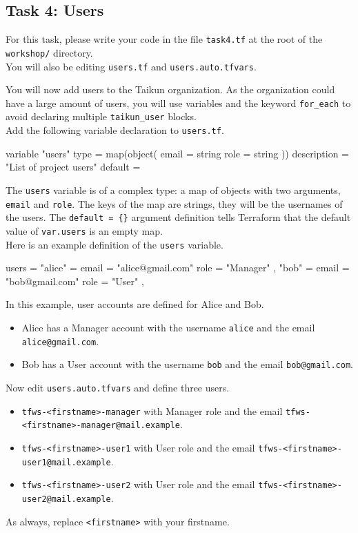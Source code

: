 \subsection{Task 4: Users}\label{sec:task4}

\begin{note}
For this task, please write your code in the file \texttt{task4.tf}
at the root of the \texttt{workshop/} directory.\\
You will also be editing \texttt{users.tf} and \texttt{users.auto.tfvars}.
\end{note}

You will now add users to the Taikun organization.
As the organization could have a large amount of users, you will use variables
and the keyword \texttt{for\_each} to avoid declaring multiple \texttt{taikun\_user}
blocks.\\

Add the following variable declaration to \texttt{users.tf}.
\begin{tf}
variable "users" {
  type = map(object({
    email = string
    role  = string
  }))
  description = "List of project users"
  default     = {}
}
\end{tf}

The \texttt{users} variable is of a complex type:
a map of objects with two arguments, \texttt{email} and \texttt{role}.
The keys of the map are strings, they will be the usernames of the users.
The \texttt{default = \{\}} argument definition tells Terraform that the default value of \texttt{var.users} is an empty map.\\

Here is an example definition of the \texttt{users} variable.
\begin{tf}
users = {
  "alice" = {
    email = "alice@gmail.com"
    role  = "Manager"
  },
  "bob" = {
    email = "bob@gmail.com"
    role  = "User"
  },
}
\end{tf}
In this example, user accounts are defined for Alice and Bob.
\begin{itemize}
  \item Alice has a Manager account with the username \texttt{alice} and the email \texttt{alice@gmail.com}.
  \item Bob has a User account with the username \texttt{bob} and the email \texttt{bob@gmail.com}.
\end{itemize}
Now edit \texttt{users.auto.tfvars} and define three users.
\begin{itemize}
  \item \texttt{tfws-<firstname>-manager} with Manager role and the email \texttt{tfws-<firstname>-manager@mail.example}.
  \item \texttt{tfws-<firstname>-user1} with User role and the email \texttt{tfws-<firstname>-user1@mail.example}.
  \item \texttt{tfws-<firstname>-user2} with User role and the email \texttt{tfws-<firstname>-user2@mail.example}.
\end{itemize}
As always, replace \texttt{<firstname>} with your firstname.\\

